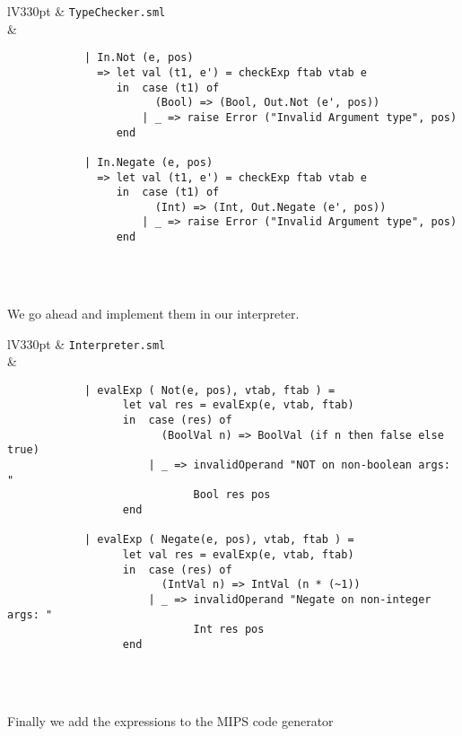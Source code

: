 \documentclass[a4paper]{article}
\begin{document}
\begin{center}	
	\begin{tabular}{lV{330pt}}
		\toprule
		& \verb|TypeChecker.sml|\\
		\midrule
		&
		\begin{verbatim}
			| In.Not (e, pos)
			  => let val (t1, e') = checkExp ftab vtab e
			     in  case (t1) of
			           (Bool) => (Bool, Out.Not (e', pos))
			         | _ => raise Error ("Invalid Argument type", pos)
			     end
			
			| In.Negate (e, pos)
			  => let val (t1, e') = checkExp ftab vtab e
			     in  case (t1) of
			           (Int) => (Int, Out.Negate (e', pos))
			         | _ => raise Error ("Invalid Argument type", pos)
			     end
		\end{verbatim}
		\\
		\bottomrule \\
	\end{tabular}
\end{center}

We go ahead and implement them in our interpreter.

\begin{center}	
	\begin{tabular}{lV{330pt}}
		\toprule
		& \verb|Interpreter.sml|\\
		\midrule
		&
		\begin{verbatim}
			| evalExp ( Not(e, pos), vtab, ftab ) =
			      let val res = evalExp(e, vtab, ftab)
			      in  case (res) of
			            (BoolVal n) => BoolVal (if n then false else true)
			          | _ => invalidOperand "NOT on non-boolean args: " 
			                 Bool res pos
			      end
			
			| evalExp ( Negate(e, pos), vtab, ftab ) =
			      let val res = evalExp(e, vtab, ftab)
			      in  case (res) of
			            (IntVal n) => IntVal (n * (~1))
			          | _ => invalidOperand "Negate on non-integer args: " 
			                 Int res pos
			      end
		\end{verbatim}
		\\
		\bottomrule \\
	\end{tabular}
\end{center}

Finally we add the expressions to the MIPS code generator
\end{document}
